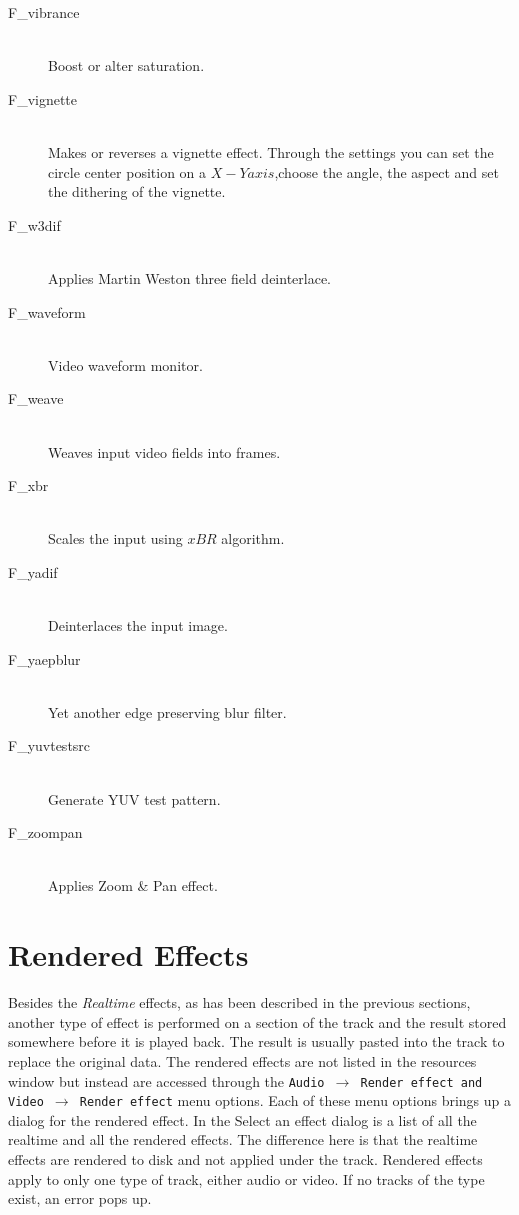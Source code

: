 \begin{description}
\item [F\_vibrance]~\\Boost or alter saturation.
\item [F\_vignette]~\\Makes or reverses a vignette
  effect. Through the settings you can set the circle center position
  on a $X-Y axis$,choose the angle, the aspect and set the dithering
  of the vignette.
\item [F\_w3dif]~\\Applies Martin Weston three field
  deinterlace.
\item [F\_waveform]~\\Video waveform monitor.
\item [F\_weave]~\\Weaves input video fields into frames.
\item [F\_xbr]~\\Scales the input using $xBR$ algorithm.
\item [F\_yadif]~\\Deinterlaces the input image.
\item [F\_yaepblur]~\\Yet another edge preserving blur filter.
\item [F\_yuvtestsrc]~\\Generate YUV test pattern.
\item [F\_zoompan]~\\Applies Zoom \& Pan effect.
\end{description}


\section[Rendered Effects]{Rendered Effects}%
\label{sec:rendered_effects}

Besides the \textit{Realtime} effects, as has been described in the previous sections, another type of effect is performed on a section of the track and the result stored somewhere before it is played back. The result is usually pasted into the track to replace the original data. The rendered effects are not listed in the resources window but instead are accessed through the \texttt{Audio $\rightarrow$ Render effect and Video $\rightarrow$ Render effect} menu options. Each of these menu options brings up a dialog for the rendered effect. In the Select an effect dialog is a list of all the realtime and all the rendered effects. The difference here is that the realtime effects are rendered to disk and not applied under the track. Rendered effects apply to only one type of track, either audio or video. If no tracks of the type exist, an error pops up.


